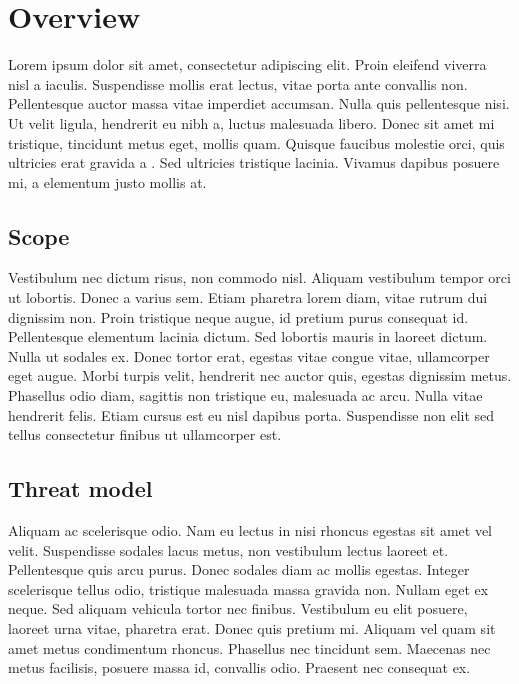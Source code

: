 \chapter{Overview}
Lorem ipsum dolor sit amet, consectetur adipiscing elit. Proin eleifend viverra nisl a iaculis. 
Suspendisse mollis erat lectus, vitae porta ante convallis non. Pellentesque auctor massa vitae imperdiet accumsan. Nulla quis pellentesque nisi. Ut velit ligula, hendrerit eu nibh a,
luctus malesuada libero. Donec sit amet mi tristique, tincidunt metus eget, mollis quam. Quisque faucibus molestie orci, quis ultricies erat gravida a
. Sed ultricies tristique lacinia. Vivamus dapibus posuere mi, a elementum justo mollis at.

\section{Scope}
Vestibulum nec dictum risus, non commodo nisl. Aliquam vestibulum tempor orci ut lobortis. Donec a varius sem. Etiam pharetra lorem diam, vitae rutrum dui dignissim non. 
Proin tristique neque augue, id pretium purus consequat id. Pellentesque elementum lacinia dictum. Sed lobortis mauris in laoreet dictum. Nulla ut sodales ex. Donec tortor erat, egestas vitae congue vitae, ullamcorper eget augue. Morbi turpis velit, hendrerit nec auctor quis, egestas dignissim metus. Phasellus odio diam, sagittis non tristique eu, malesuada ac arcu. Nulla vitae hendrerit felis. Etiam cursus est eu nisl dapibus porta. Suspendisse non elit sed tellus consectetur finibus ut ullamcorper est.

\section{Threat model}

Aliquam ac scelerisque odio. Nam eu lectus in nisi rhoncus egestas sit amet vel velit. Suspendisse sodales lacus metus, non vestibulum lectus laoreet et. Pellentesque quis arcu purus. Donec sodales diam ac mollis egestas. Integer scelerisque tellus odio, tristique malesuada massa gravida non. Nullam eget ex neque. Sed aliquam vehicula tortor nec finibus. Vestibulum eu elit posuere, laoreet urna vitae, pharetra erat. Donec quis pretium mi. Aliquam vel quam sit amet metus condimentum rhoncus. Phasellus nec tincidunt sem. Maecenas nec metus facilisis, posuere massa id, convallis odio. Praesent nec consequat ex.

